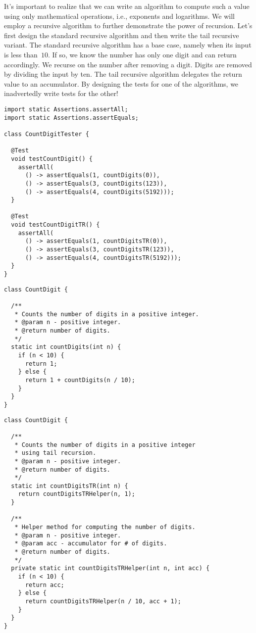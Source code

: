It's important to realize that we can write an algorithm to compute such a value using only mathematical operations, i.e., exponents and logarithms.
We will employ a recursive algorithm to further demonstrate the power of recursion.
Let's first design the standard recursive algorithm and then write the tail recursive variant.
The standard recursive algorithm has a base case, namely when its input is less than~$10$. If so, we know the number has only one digit and can return accordingly.
We recurse on the number after removing a digit.
Digits are removed by dividing the input by ten.
The tail recursive algorithm delegates the return value to an accumulator.
By designing the tests for one of the algorithms, we inadvertedly write tests for the other!

\begin{lstlisting}[language=MyJava]
import static Assertions.assertAll;
import static Assertions.assertEquals;

class CountDigitTester {

  @Test
  void testCountDigit() {
    assertAll(
      () -> assertEquals(1, countDigits(0)),
      () -> assertEquals(3, countDigits(123)),
      () -> assertEquals(4, countDigits(5192)));
  }

  @Test
  void testCountDigitTR() {
    assertAll(
      () -> assertEquals(1, countDigitsTR(0)),
      () -> assertEquals(3, countDigitsTR(123)),
      () -> assertEquals(4, countDigitsTR(5192)));
  }
}
\end{lstlisting}

\begin{lstlisting}[language=MyJava]
class CountDigit {

  /**
   * Counts the number of digits in a positive integer.
   * @param n - positive integer.
   * @return number of digits.
   */
  static int countDigits(int n) {
    if (n < 10) {
      return 1;
    } else {
      return 1 + countDigits(n / 10);
    }
  }
}
\end{lstlisting}

\begin{lstlisting}[language=MyJava]
class CountDigit {

  /**
   * Counts the number of digits in a positive integer
   * using tail recursion.
   * @param n - positive integer.
   * @return number of digits.
   */
  static int countDigitsTR(int n) {
    return countDigitsTRHelper(n, 1);
  }

  /**
   * Helper method for computing the number of digits.
   * @param n - positive integer.
   * @param acc - accumulator for # of digits.
   * @return number of digits.
   */
  private static int countDigitsTRHelper(int n, int acc) {
    if (n < 10) {
      return acc;
    } else {
      return countDigitsTRHelper(n / 10, acc + 1);
    }
  }
}
\end{lstlisting}

